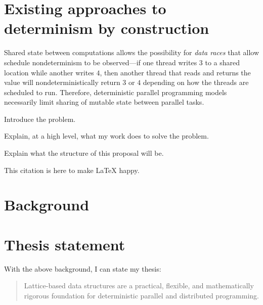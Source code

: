 \documentclass{article}
\begin{document}
\section{Existing approaches to determinism by construction}

Shared state between computations allows the possibility for
\emph{data races} that allow schedule nondeterminism to be
observed---if one thread writes $3$ to a shared location while another
writes $4$, then another thread that reads and returns the value will
nondeterministically return $3$ or $4$ depending on how the threads
are scheduled to run.  Therefore, deterministic parallel programming
models necessarily limit sharing of mutable state between parallel
tasks.


Introduce the problem.

Explain, at a high level, what my work does to solve the problem.

Explain what the structure of this proposal will be.

This citation \cite{LVars-TR} is here to make LaTeX happy.

\section{Background}

\section{Thesis statement}


With the above background, I can state my thesis:



\begin{quote}
  Lattice-based data structures are a
  practical, flexible, and mathematically rigorous foundation for
  deterministic parallel and distributed programming.
\end{quote}
\end{document}
